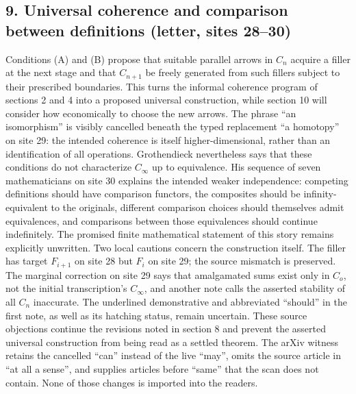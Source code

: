 \documentclass[10pt,oneside]{book}
\begin{document}
\subsection*{9. Universal coherence and comparison between definitions (letter, sites 28--30)}
Conditions (A) and (B) propose that suitable parallel arrows in $C_n$ acquire a filler at the next stage and that $C_{n+1}$ be freely generated from such fillers subject to their prescribed boundaries. This turns the informal coherence program of sections 2 and 4 into a proposed universal construction, while section 10 will consider how economically to choose the new arrows. The phrase ``an isomorphism'' is visibly cancelled beneath the typed replacement ``a homotopy'' on site 29: the intended coherence is itself higher-dimensional, rather than an identification of all operations. Grothendieck nevertheless says that these conditions do not characterize $C_\infty$ up to equivalence. His sequence of seven mathematicians on site 30 explains the intended weaker independence: competing definitions should have comparison functors, the composites should be infinity-equivalent to the originals, different comparison choices should themselves admit equivalences, and comparisons between those equivalences should continue indefinitely. The promised finite mathematical statement of this story remains explicitly unwritten. Two local cautions concern the construction itself. The filler has target $F_{i+1}$ on site 28 but $F_i$ on site 29; the source mismatch is preserved. The marginal correction on site 29 says that amalgamated sums exist only in $C_o$, not the initial transcription's $C_\infty$, and another note calls the asserted stability of all $C_n$ inaccurate. The underlined demonstrative and abbreviated ``should'' in the first note, as well as its hatching status, remain uncertain. These source objections continue the revisions noted in section 8 and prevent the asserted universal construction from being read as a settled theorem. The arXiv witness retains the cancelled ``can'' instead of the live ``may'', omits the source article in ``at all a sense'', and supplies articles before ``same'' that the scan does not contain. None of those changes is imported into the readers.
\end{document}
